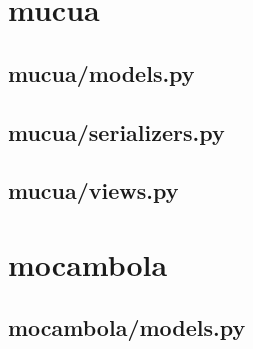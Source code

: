 \section{mucua}

\subsection{mucua/models.py}


\subsection{mucua/serializers.py}


\subsection{mucua/views.py}



%

\section{mocambola}

\subsection{mocambola/models.py}


%

